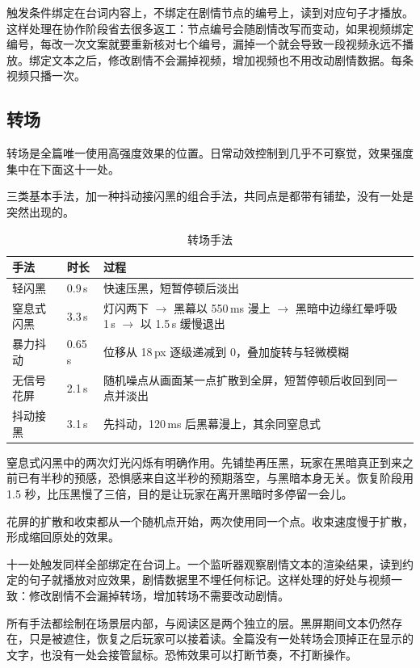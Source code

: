 触发条件绑定在台词内容上，不绑定在剧情节点的编号上，读到对应句子才播放。这样处理在协作阶段省去很多返工：节点编号会随剧情改写而变动，如果视频绑定编号，每改一次文案就要重新核对七个编号，漏掉一个就会导致一段视频永远不播放。绑定文本之后，修改剧情不会漏掉视频，增加视频也不用改动剧情数据。每条视频只播一次。

\subsection{转场}

转场是全篇唯一使用高强度效果的位置。日常动效控制到几乎不可察觉，效果强度集中在下面这十一处。

三类基本手法，加一种抖动接闪黑的组合手法，共同点是都带有铺垫，没有一处是突然出现的。

\begin{table}[htbp]
\centering
\caption{转场手法}
\small
\begin{tabularx}{\linewidth}{@{}l l X@{}}
\toprule
手法 & 时长 & 过程 \\
\midrule
轻闪黑 & 0.9\,s & 快速压黑，短暂停顿后淡出 \\
窒息式闪黑 & 3.3\,s & 灯闪两下 $\rightarrow$ 黑幕以 550\,ms 漫上 $\rightarrow$ 黑暗中边缘红晕呼吸 1\,s $\rightarrow$ 以 1.5\,s 缓慢退出 \\
暴力抖动 & 0.65\,s & 位移从 18\,px 逐级递减到 0，叠加旋转与轻微模糊 \\
无信号花屏 & 2.1\,s & 随机噪点从画面某一点扩散到全屏，短暂停顿后收回到同一点并淡出 \\
抖动接黑 & 3.1\,s & 先抖动，120\,ms 后黑幕漫上，其余同窒息式 \\
\bottomrule
\end{tabularx}
\end{table}

窒息式闪黑中的两次灯光闪烁有明确作用。先铺垫再压黑，玩家在黑暗真正到来之前已有半秒的预感，恐惧感来自这半秒的预期落空，与黑暗本身无关。恢复阶段用 1.5 秒，比压黑慢了三倍，目的是让玩家在离开黑暗时多停留一会儿。

花屏的扩散和收束都从一个随机点开始，两次使用同一个点。收束速度慢于扩散，形成缩回原处的效果。

十一处触发同样全部绑定在台词上。一个监听器观察剧情文本的渲染结果，读到约定的句子就播放对应效果，剧情数据里不埋任何标记。这样处理的好处与视频一致：修改剧情不会漏掉转场，增加转场不需要改动剧情。

所有手法都绘制在场景层内部，与阅读区是两个独立的层。黑屏期间文本仍然存在，只是被遮住，恢复之后玩家可以接着读。全篇没有一处转场会顶掉正在显示的文字，也没有一处会接管鼠标。恐怖效果可以打断节奏，不打断操作。
